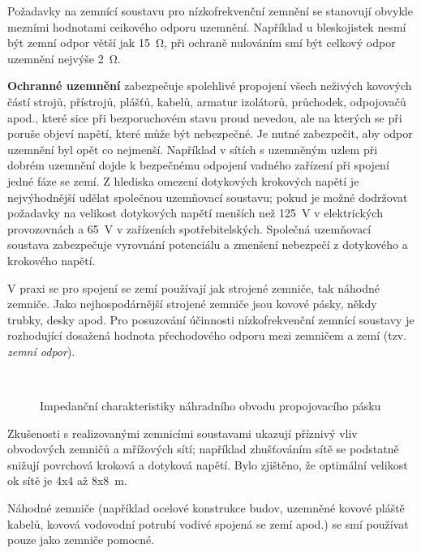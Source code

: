       Požadavky na zemnící soustavu pro nízkofrekvenční zemnění se stanovují obvykle mezními
      hodnotami ceikového odporu uzemnění. Například u bleskojistek nesmí být zemní odpor větší jak
      \SI{15}{\ohm}, při ochraně nulováním smí být celkový odpor uzemnění nejvýše \SI{2}{\ohm}. 

      \textbf{Ochranné uzemnění} zabezpečuje spolehlivé propojení všech neživých kovových částí
      strojů, přístrojů, plášťů, kabelů, armatur izolátorů, průchodek, odpojovačů apod., které sice
      při bezporuchovém stavu proud nevedou, ale na kterých se při poruše objeví napětí, které může
      být nebezpečné. Je nutné zabezpečit, aby odpor uzemnění byl opět co nejmenší. Například v
      sítích s uzemněným uzlem při dobrém uzemnění dojde k bezpečnému odpojení vadného zařízení při
      spojení jedné fáze se zemí. Z hlediska omezení dotykových krokových napětí je nejvýhodnější
      udělat společnou uzemňovací soustavu; pokud je možné dodržovat požadavky na velikost
      dotykových napětí menších než \SI{125}{\V} v elektrických provozovnách a \SI{65}{\V} v
      zařízeních spotřebitelských. Společná uzemňovací soustava zabezpečuje vyrovnání potenciálu a
      zmenšení nebezpečí z dotykového a krokového napětí. 

      V praxi se pro spojení se zemí používají jak strojené zemniče, tak náhodné zemniče. Jako
      nejhospodárnější strojené zemniče jsou kovové pásky, někdy trubky, desky apod. Pro posuzování
      účinnosti nízkofrekvenční zemnící soustavy je rozhodující dosažená hodnota přechodového odporu
      mezi zemničem a zemí (tzv. \emph{zemní odpor}). 

      \begin{figure}[ht!]
        \centering  
         \\
        \caption{Impedanční charakteristiky náhradního obvodu propojovacího pásku}
        \label{emc:fig001}
      \end{figure}

      Zkušenosti s realizovanými zemnicími soustavami ukazují příznivý vliv obvodových zemničů a
      mřížových sítí; například zhušťováním sítě se podstatně snižují povrchová kroková a dotyková
      napětí. Bylo zjištěno, že optimální velikost ok sítě je 4x4 až 8x\SI{8}{\m}. 

      Náhodné zemniče (například ocelové konstrukce budov, uzemněné kovové pláště kabelů, kovová
      vodovodní potrubí vodivé spojená se zemí apod.) se smí používat pouze jako zemniče pomocné.
      
